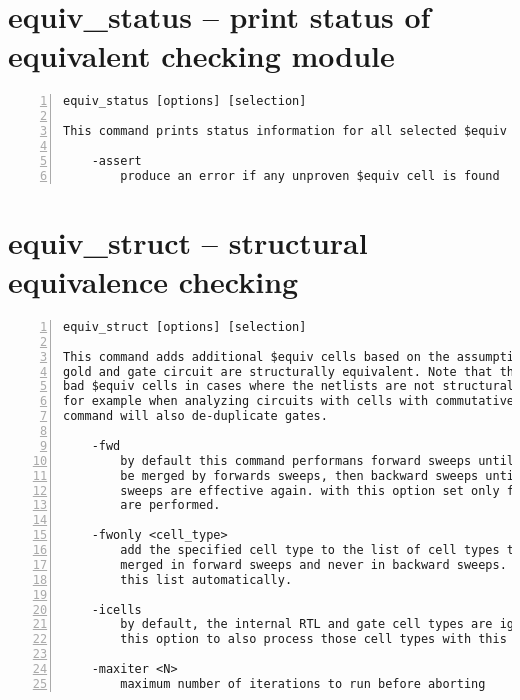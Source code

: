 \section{equiv\_status -- print status of equivalent checking module}
\label{cmd:equiv_status}
\begin{lstlisting}[numbers=left,frame=single]
    equiv_status [options] [selection]

This command prints status information for all selected $equiv cells.

    -assert
        produce an error if any unproven $equiv cell is found
\end{lstlisting}

\section{equiv\_struct -- structural equivalence checking}
\label{cmd:equiv_struct}
\begin{lstlisting}[numbers=left,frame=single]
    equiv_struct [options] [selection]

This command adds additional $equiv cells based on the assumption that the
gold and gate circuit are structurally equivalent. Note that this can introduce
bad $equiv cells in cases where the netlists are not structurally equivalent,
for example when analyzing circuits with cells with commutative inputs. This
command will also de-duplicate gates.

    -fwd
        by default this command performans forward sweeps until nothing can
        be merged by forwards sweeps, then backward sweeps until forward
        sweeps are effective again. with this option set only forward sweeps
        are performed.

    -fwonly <cell_type>
        add the specified cell type to the list of cell types that are only
        merged in forward sweeps and never in backward sweeps. $equiv is in
        this list automatically.

    -icells
        by default, the internal RTL and gate cell types are ignored. add
        this option to also process those cell types with this command.

    -maxiter <N>
        maximum number of iterations to run before aborting
\end{lstlisting}

